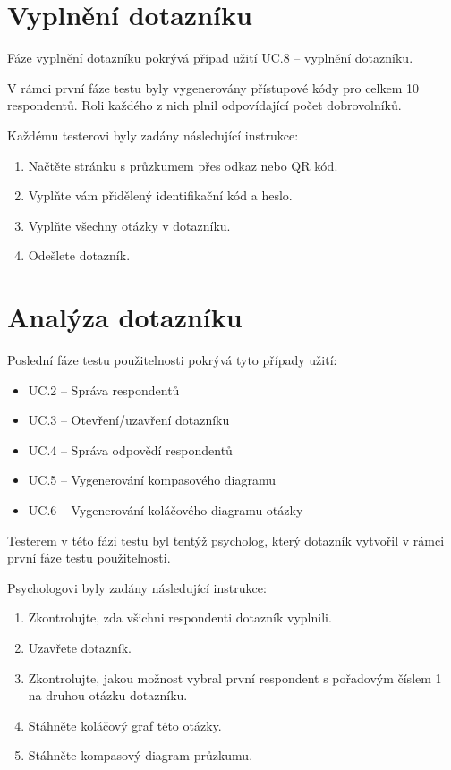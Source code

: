 \section{Vyplnění dotazníku}
Fáze vyplnění dotazníku pokrývá případ užití UC.8 – vyplnění dotazníku.

V rámci první fáze testu byly vygenerovány přístupové kódy pro
celkem 10 respondentů. Roli každého z nich plnil odpovídající počet dobrovolníků.

Každému testerovi byly zadány následující instrukce:

\begin{enumerate}
    \item Načtěte stránku s průzkumem přes odkaz nebo QR kód.
    \item Vyplňte vám přidělený identifikační kód a heslo.
    \item Vyplňte všechny otázky v dotazníku.
    \item Odešlete dotazník.
\end{enumerate}

\section{Analýza dotazníku}
Poslední fáze testu použitelnosti pokrývá tyto případy užití:

\begin{itemize}
    \item UC.2 – Správa respondentů
    \item UC.3 – Otevření/uzavření dotazníku
    \item UC.4 – Správa odpovědí respondentů
    \item UC.5 – Vygenerování kompasového diagramu
    \item UC.6 – Vygenerování koláčového diagramu otázky
\end{itemize}

Testerem v této fázi testu byl tentýž psycholog, který dotazník vytvořil
v rámci první fáze testu použitelnosti.

Psychologovi byly zadány následující instrukce:

\begin{enumerate}
    \item Zkontrolujte, zda všichni respondenti dotazník vyplnili.
    \item Uzavřete dotazník.
    \item Zkontrolujte, jakou možnost vybral první respondent s pořadovým číslem 1
    na druhou otázku dotazníku.
    \item Stáhněte koláčový graf této otázky.
    \item Stáhněte kompasový diagram průzkumu.
\end{enumerate}

